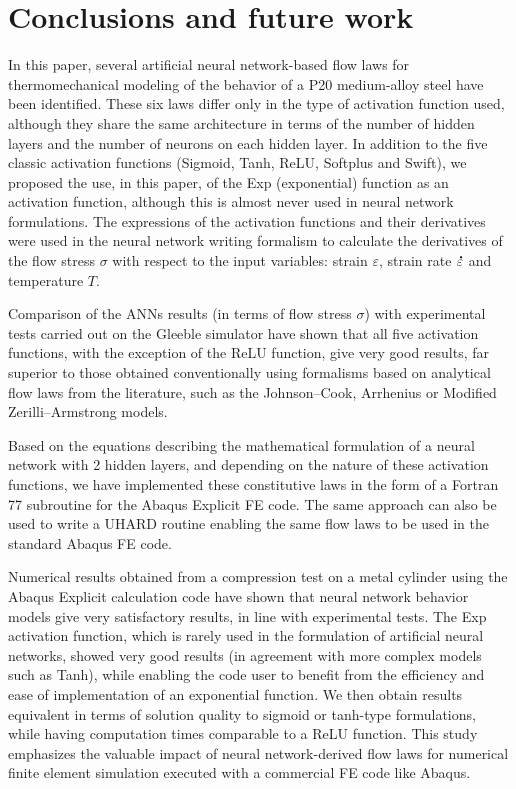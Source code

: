 \documentclass[algorithms,article,submit,pdftex,oneauthors]{Definitions/mdpi}
\DeclareRobustCommand{\mdot}[1]{\accentset{\mbox{\bfseries .}}{#1}}
\begin{document}
\section{Conclusions and future work}\label{sec:Conclusions}
In this paper, several artificial neural network-based flow laws for thermomechanical modeling of the behavior of a P20 medium-alloy steel have been identified. 
These six laws differ only in the type of activation function used, although they share the same architecture in terms of the number of hidden layers and the number of neurons on each hidden layer.
In addition to the five classic activation functions (Sigmoid, Tanh, ReLU, Softplus and Swift), we proposed the use, in this paper, of the Exp (exponential) function as an activation function, although this is almost never used in neural network formulations.
The expressions of the activation functions and their derivatives were used in the neural network writing formalism to calculate the derivatives of the flow stress $\sigma$ with respect to the input variables: strain $\varepsilon$, strain rate $\mdot{\varepsilon}$ and temperature $T$.

Comparison of the ANNs results (in terms of flow stress $\sigma$) with experimental tests carried out on the Gleeble simulator have shown that all five activation functions, with the exception of the ReLU function, give very good results, far superior to those obtained conventionally using formalisms based on analytical flow laws from the literature, such as the Johnson--Cook, Arrhenius or Modified Zerilli--Armstrong models.

Based on the equations describing the mathematical formulation of a neural network with 2 hidden layers, and depending on the nature of these activation functions, we have implemented these constitutive laws in the form of a Fortran 77 subroutine for the Abaqus Explicit FE code. 
The same approach can also be used to write a UHARD routine enabling the same flow laws to be used in the standard Abaqus FE code.

Numerical results obtained from a compression test on a metal cylinder using the Abaqus Explicit calculation code have shown that neural network behavior models give very satisfactory results, in line with experimental tests. The Exp activation function, which is rarely used in the formulation of artificial neural networks, showed very good results (in agreement with more complex models such as Tanh), while enabling the code user to benefit from the efficiency and ease of implementation of an exponential function. We then obtain results equivalent in terms of solution quality to sigmoid or tanh-type formulations, while having computation times comparable to a ReLU function.
This study emphasizes the valuable impact of neural network-derived flow laws for numerical finite element simulation executed with a commercial FE code like Abaqus.
\end{document}
